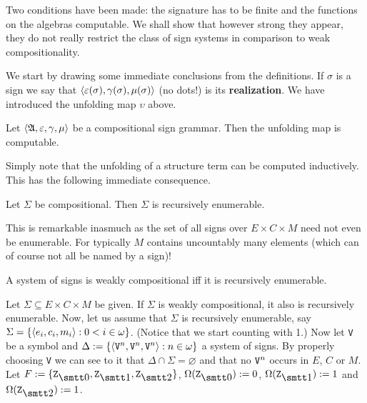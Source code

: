 Two conditions have been made: the signature has to be
finite and the functions on the algebras computable. We shall
show that however strong they appear, they do not really
restrict the class of sign systems in comparison to weak
compositionality.

We start by drawing some immediate conclusions from the definitions. 
If $\sigma$ is a sign we say that $\langle {\varepsilon}(\sigma), 
{\gamma}(\sigma), {\mu}(\sigma)\rangle$ (no dots!) is its \textbf{realization}. 
We have introduced the unfolding map $\upsilon$ above.
\begin{prop}
Let $\langle \mathfrak{A}, \varepsilon, \gamma, \mu\rangle$ be a compositional
sign grammar. Then the unfolding map is computable.
\end{prop}
Simply note that the unfolding of a structure term can be computed  
inductively. This has the following immediate consequence.
\begin{cor}
\label{cor:recen}
Let $\Sigma$ be compositional. Then $\Sigma$ is recursively
enumerable.
\end{cor}
This is remarkable inasmuch as the set of all signs over
$E \times C\times M$ need not even be enumerable. For
typically $M$ contains uncountably many elements
(which can of course not all be named by a sign)!
\begin{thm}
\label{thm:rekzeichen}
A system of signs is weakly compositional iff it
is recursively enumerable.
\end{thm}
\proofbeg
Let $\Sigma \subseteq E \times C \times M$ be given. If
$\Sigma$ is weakly compositional, it also is recursively
enumerable. Now, let us assume that $\Sigma$ is recursively
enumerable, say $\Sigma = \{\langle e_i, c_i, m_i\rangle : 0 < i
\in \omega\}$. (Notice that we start counting with 1.)
Now let {\tt V} be a symbol and $\Delta :=
\{\langle \mbox{\tt V}^n, \mbox{\tt V}^n, \mbox{\tt V}^n\rangle :
n \in \omega\}$ a system of signs. By properly choosing {\tt V}
we can see to it that $\Delta \cap \Sigma = \varnothing$
and that no $\mbox{\tt V}^n$ occurs in $E$, $C$ or $M$.
Let $F := \{\mbox{\tt Z}_{\snull}, \mbox{\tt Z}_{\seins}, 
\mbox{\tt Z}_{\szwei}\}$, $\Omega(\mbox{\tt Z}_{\snull}) 
:= 0$, $\Omega(\mbox{\tt Z}_{\seins}) := 1$
and $\Omega(\mbox{\tt Z}_{\szwei}) := 1$.
